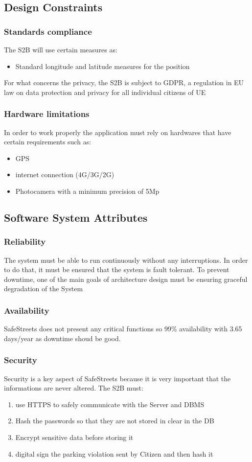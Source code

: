 \documentclass{article}
\begin{document}
\subsection{Design Constraints}
\subsubsection{Standards compliance}
The S2B  will use certain measures as:
\begin{itemize}
    \item Standard longitude and latitude measures for the position
\end{itemize}
For what concerns the privacy, the S2B is subject to GDPR, a regulation in EU law on data protection 
and privacy for all individual citizens of UE  

\subsubsection{Hardware limitations}
In order to work properly the application must rely on hardwares that have certain requirements 
such as:
\begin{itemize}
    \item GPS
    \item internet connection (4G/3G/2G)
    \item Photocamera with a minimum precision of 5Mp 
\end{itemize}   

\subsection{Software System Attributes}
\subsubsection{Reliability}
The system must be able to run continuously without any interruptions. In order to do that, it must be ensured 
that the system is fault tolerant. To prevent downtime, one of the main goals of architecture design must be 
ensuring graceful degradation of the System
\subsubsection{Availability}
SafeStreets does not present any critical functions so 99\% availability with 3.65 days/year
as downtime shoud be good.  
\subsubsection{Security}
Security is a key aspect of SafeStreets because it is very important that the informations are never altered.
The S2B must:
\begin{enumerate}
 \item use HTTPS to safely communicate with the Server and DBMS    
 \item Hash the passwords so that they are not stored in clear in the DB
 \item Encrypt sensitive data before storing it
 \item digital sign the parking violation sent by Citizen and then hash it  
\end{enumerate} 
\end{document}

